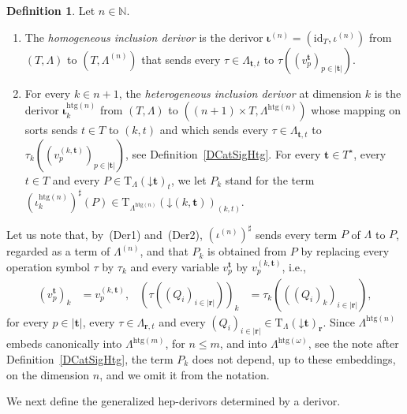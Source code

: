 \documentclass[a4paper, reqno]{amsbook}
\newcommand{\bb}[1]{\ensuremath{\lvert #1 \rvert}}
\newcommand{\vs}[1]{\mathbin{\downarrow}#1}
\newcommand{\htg}{\mathrm{htg}}                %
\newcommand{\id}{\mathrm{id}}
\theoremstyle{plain}
\theoremstyle{definition}
\newtheorem{definition}[theorem]{Definition}
\begin{document}
\begin{definition}\label{DInclusionDerivors}
Let $n\in\mathbb{N}$.
\begin{enumerate}
\item The \emph{homogeneous inclusion derivor} is the derivor $\boldsymbol{\iota}^{(n)}=(\id_{T},\iota^{(n)})$ from $(T,\Lambda)$ to $(T,\Lambda^{(n)})$ that sends every $\tau\in\Lambda_{\mathbf{t},t}$ to $\tau((v^{\mathbf{t}}_{p})_{p\in\bb{\mathbf{t}}})$.
\item For every $k\in n+1$, the \emph{heterogeneous inclusion derivor} at dimension $k$ is the derivor $\boldsymbol{\iota}^{\htg(n)}_{k}$ from $(T,\Lambda)$ to $((n+1)\times T,\Lambda^{\htg(n)})$ whose mapping on sorts sends $t\in T$ to $(k,t)$ and which sends every $\tau\in\Lambda_{\mathbf{t},t}$ to $\tau_{k}((v^{(k,\mathbf{t})}_{p})_{p\in\bb{\mathbf{t}}})$, see Definition~\ref{DCatSigHtg}.
For every $\mathbf{t}\in T^{\star}$, every $t\in T$ and every $P\in\mathrm{T}_{\Lambda}(\vs{\mathbf{t}})_{t}$, we let $P_{k}$ stand for the term $(\iota^{\htg(n)}_{k})^{\sharp}(P)\in\mathrm{T}_{\Lambda^{\htg(n)}}(\vs{(k,\mathbf{t})})_{(k,t)}$.
\end{enumerate}
\end{definition}

Let us note that, by~(Der1) and~(Der2), $(\iota^{(n)})^{\sharp}$ sends every term $P$ of $\Lambda$ to $P$, regarded as a term of $\Lambda^{(n)}$, and that $P_{k}$ is obtained from $P$ by replacing every operation symbol $\tau$ by $\tau_{k}$ and every variable $v^{\mathbf{t}}_{p}$ by $v^{(k,\mathbf{t})}_{p}$, i.e.,
\begin{align*}
\left(v^{\mathbf{t}}_{p}\right)_{k}&=v^{(k,\mathbf{t})}_{p},
&
\left(\tau\left((Q_{i})_{i\in\bb{\mathbf{r}}}\right)\right)_{k}&=\tau_{k}\left(\left((Q_{i})_{k}\right)_{i\in\bb{\mathbf{r}}}\right),
\end{align*}
for every $p\in\bb{\mathbf{t}}$, every $\tau\in\Lambda_{\mathbf{r},t}$ and every $(Q_{i})_{i\in\bb{\mathbf{r}}}\in\mathrm{T}_{\Lambda}(\vs{\mathbf{t}})_{\mathbf{r}}$.
Since $\Lambda^{\htg(n)}$ embeds canonically into $\Lambda^{\htg(m)}$, for $n\leq m$, and into $\Lambda^{\htg(\omega)}$, see the note after Definition~\ref{DCatSigHtg}, the term $P_{k}$ does not depend, up to these embeddings, on the dimension $n$, and we omit it from the notation.

We next define the generalized hep-derivors determined by a derivor.
\end{document}
